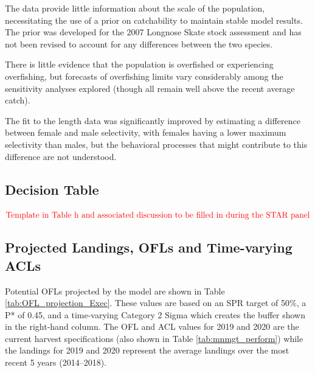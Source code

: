 \documentclass[12pt,]{article}
\begin{document}
The data provide little information about the scale of the population,
necessitating the use of a prior on catchability to maintain stable
model results. The prior was developed for the 2007 Longnose Skate stock
assessment and has not been revised to account for any differences
between the two species.

There is little evidence that the population is overfished or
experiencing overfishing, but forecasts of overfishing limits vary
considerably among the sensitivity analyses explored (though all remain
well above the recent average catch).

The fit to the length data was significantly improved by estimating a
difference between female and male selectivity, with females having a
lower maximum selectivity than males, but the behavioral processes that
might contribute to this difference are not understood.

\FloatBarrier

\hypertarget{decision-table}{%
\subsection*{Decision Table}\label{decision-table}}

\textbf{\(\color{red}{\text{Template in Table h and associated discussion to be filled in during the STAR panel}}\)}

\FloatBarrier

\hypertarget{projected-landings-ofls-and-time-varying-acls}{%
\subsection*{Projected Landings, OFLs and Time-varying
ACLs}\label{projected-landings-ofls-and-time-varying-acls}}

Potential OFLs projected by the model are shown in Table
\ref{tab:OFL_projection_Exec}. These values are based on an SPR target
of 50\%, a P* of 0.45, and a time-varying Category 2 Sigma which creates
the buffer shown in the right-hand column. The OFL and ACL values for
2019 and 2020 are the current harvest specifications (also shown in
Table \ref{tab:mnmgt_perform}) while the landings for 2019 and 2020
represent the average landings over the most recent 5 years
(2014--2018).
\end{document}
